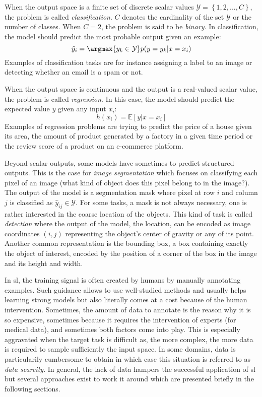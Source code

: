 When the output space is a finite set of discrete scalar values $\mathcal{Y} = \left\{1, 2, ..., C\right\}$, the problem is called \textit{classification}. $C$ denotes the cardinality of the set $\mathcal{Y}$ or the number of classes. When $C = 2$, the problem is said to be \textit{binary}. In classification, the model should predict the most probable output given an example:
\begin{equation}
\hat{y}_i = \argmax{y_k \in \mathcal{Y}} p(y=y_k|x=x_i)
\end{equation}
Examples of classification tasks are for instance assigning a label to an image or detecting whether an email is a spam or not. 

When the output space is continuous and the output is a real-valued scalar value, the problem is called \textit{regression}. In this case, the model should predict the expected value $y$ given any input $x_i$:
\begin{equation}
h(x_i) = \mathbb{E}\left[y|x=x_i\right]
\end{equation}
Examples of regression problems are trying to predict the price of a house given its area, the amount of product generated by a factory in a given time period or the review score of a product on an e-commerce platform. 

Beyond scalar outputs, some models have sometimes to predict structured outputs. This is the case for \textit{image segmentation} which focuses on classifying each pixel of an image (\ie what kind of object does this pixel belong to in the image?). The output of the model is a segmentation mask where pixel at row $i$ and column $j$ is classified as $\hat{y}_{ij} \in \mathcal{Y}$. For some tasks, a mask is not always necessary, one is rather interested in the coarse location of the objects. This kind of task is called \textit{detection} where the output of the model, the location, can be encoded as image coordinates $(i, j)$ representing the object's center of gravity or any of its point. Another common representation is the bounding box, a box containing exactly the object of interest, encoded by the position of a corner of the box in the image and its height and width.

In \acrlong{sl}, the training signal is often created by humans by manually annotating examples. Such guidance allows to use well-studied methods and usually helps learning strong models but also literally comes at a cost because of the human intervention. Sometimes, the amount of data to annotate is the reason why it is so expensive, sometimes because it requires the intervention of experts (\eg for medical data), and sometimes both factors come into play. This is especially aggravated when the target task is difficult as, the more complex, the more data is required to sample sufficiently the input space. In some domains, data is particularily cumbersome to obtain in which case this situation is referred to as \textit{data scarcity}. In general, the lack of data hampers the successful application of \acrlong{sl} but several approaches exist to work it around which are presented briefly in the following sections. 

